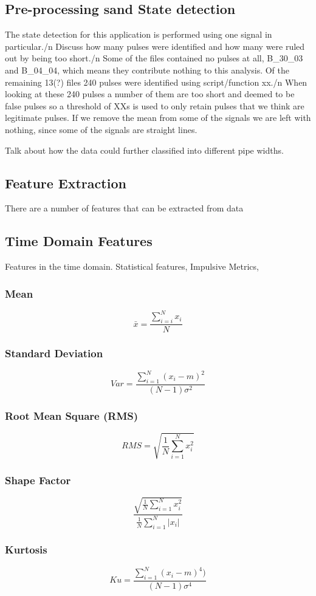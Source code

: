 \documentclass{article}
\begin{document}
\subsection{Pre-processing sand State detection}
The state detection for this application is performed using one signal in particular./n
Discuss how many pulses were identified and how many were ruled out by being too short./n
Some of the files contained no pulses at all, B\_30\_03 and B\_04\_04, which means they contribute nothing to this analysis.
Of the remaining 13(?) files 240 pulses were identified using script/function xx./n
When looking at these 240 pulses a number of them are too short and deemed to be false pulses so a threshold of XXs is used to only retain pulses that we think are legitimate pulses.
If we remove the mean from some of the signals we are left with nothing, since some of the signals are straight lines.

Talk about how the data could further classified into different pipe widths.
\subsection{Feature Extraction}
There are a number of features that can be extracted from data 
\subsection{Time Domain Features} 	
Features in the time domain. Statistical features, Impulsive Metrics, 
\subsubsection{Mean}
$$ \bar{x} = \frac{\sum^N_{i=i} x_i}{N} $$
\subsubsection{Standard Deviation}  
$$ Var =\frac{\sum^N_{i=1}(x_i-m)^2}{(N-1)\sigma^2} $$
\subsubsection{Root Mean Square (RMS)}
$$ RMS = \sqrt{\frac{1}{N} \sum^N_{i=1}x^2_i} $$
\subsubsection{Shape Factor}
$$ \frac{ \sqrt{\frac{1}{N} \sum^N_{i=1}x_i^2} }  {\frac{1}{N}\sum^N_{i=1}|x_i|} $$
\subsubsection{Kurtosis} 
$$ Ku = \frac{\sum^N_{i=1}(x_i-m)^4)}{(N-1)\sigma^4} $$ 
\end{document}
